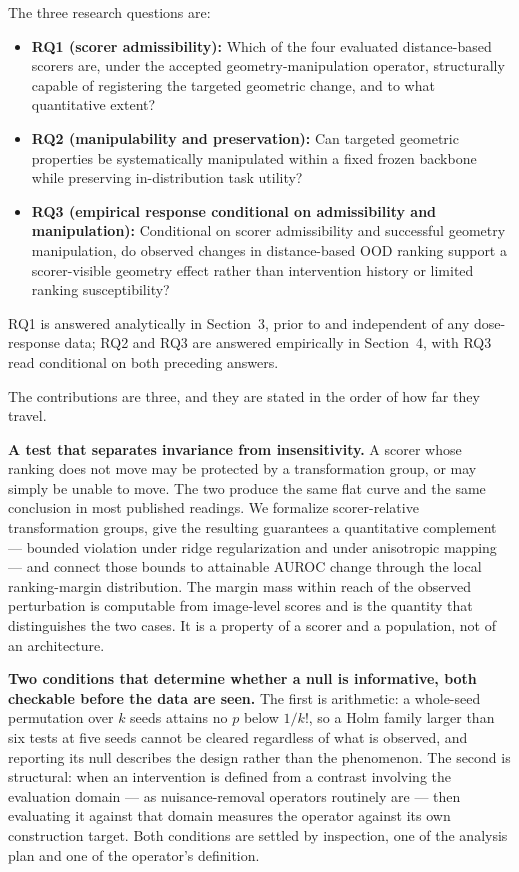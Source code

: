 \documentclass[11pt,a4paper]{article}
\begin{document}
The three research questions are:
\begin{itemize}
\item \textbf{RQ1 (scorer admissibility):} Which of the four evaluated distance-based scorers are, under the accepted geometry-manipulation operator, structurally capable of registering the targeted geometric change, and to what quantitative extent?
\item \textbf{RQ2 (manipulability and preservation):} Can targeted geometric properties be systematically manipulated within a fixed frozen backbone while preserving in-distribution task utility?
\item \textbf{RQ3 (empirical response conditional on admissibility and manipulation):} Conditional on scorer admissibility and successful geometry manipulation, do observed changes in distance-based OOD ranking support a scorer-visible geometry effect rather than intervention history or limited ranking susceptibility?
\end{itemize}

RQ1 is answered analytically in Section~3, prior to and independent of any dose-response data; RQ2 and RQ3 are answered empirically in Section~4, with RQ3 read conditional on both preceding answers.

The contributions are three, and they are stated in the order of how far they
travel.

\textbf{A test that separates invariance from insensitivity.} A scorer whose
ranking does not move may be protected by a transformation group, or may simply
be unable to move. The two produce the same flat curve and the same conclusion
in most published readings. We formalize scorer-relative transformation groups,
give the resulting guarantees a quantitative complement --- bounded violation
under ridge regularization and under anisotropic mapping --- and connect those
bounds to attainable AUROC change through the local ranking-margin
distribution. The margin mass within reach of the observed perturbation is
computable from image-level scores and is the quantity that distinguishes the
two cases. It is a property of a scorer and a population, not of an
architecture.

\textbf{Two conditions that determine whether a null is informative, both
checkable before the data are seen.} The first is arithmetic: a whole-seed
permutation over $k$ seeds attains no $p$ below $1/k!$, so a Holm family larger
than six tests at five seeds cannot be cleared regardless of what is observed,
and reporting its null describes the design rather than the phenomenon. The
second is structural: when an intervention is defined from a contrast involving
the evaluation domain --- as nuisance-removal operators routinely are --- then
evaluating it against that domain measures the operator against its own
construction target. Both conditions are settled by inspection, one of the
analysis plan and one of the operator's definition.
\end{document}
